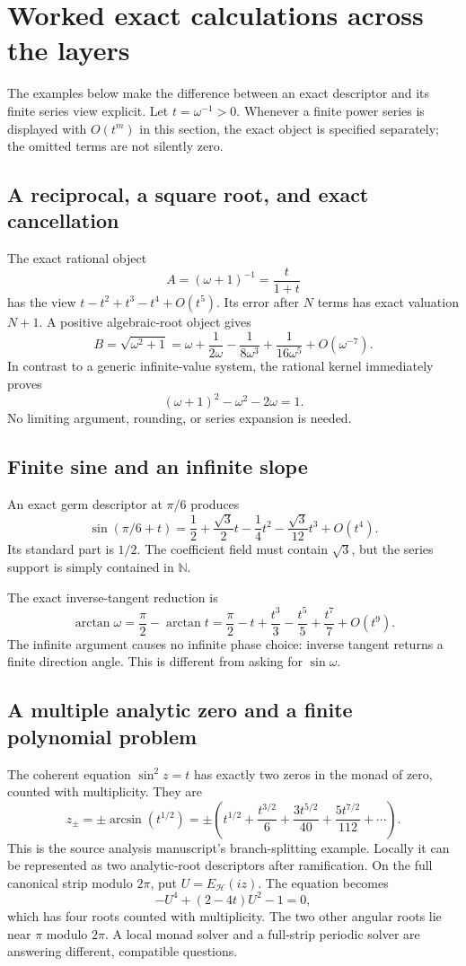 \documentclass[11pt,letterpaper]{article}
\theoremstyle{definition}
\newcommand{\N}{\mathbb N}
\numberwithin{equation}{section}
\begin{document}
\section{Worked exact calculations across the layers}\label{sec:examples}
The examples below make the difference between an exact descriptor and its finite series view explicit. Let $t=\omega^{-1}>0$. Whenever a finite power series is displayed with $O(t^m)$ in this section, the exact object is specified separately; the omitted terms are not silently zero.

\subsection{A reciprocal, a square root, and exact cancellation}
The exact rational object
\[
 A=(\omega+1)^{-1}=\frac{t}{1+t}
\]
has the view $t-t^2+t^3-t^4+O(t^5)$. Its error after $N$ terms has exact valuation $N+1$. A positive algebraic-root object gives
\[
 B=\sqrt{\omega^2+1}
  =\omega+\frac1{2\omega}-\frac1{8\omega^3}
       +\frac1{16\omega^5}+O(\omega^{-7}).
\]
In contrast to a generic infinite-value system, the rational kernel immediately proves
\[
 (\omega+1)^2-\omega^2-2\omega=1.
\]
No limiting argument, rounding, or series expansion is needed.

\subsection{Finite sine and an infinite slope}
An exact germ descriptor at $\pi/6$ produces
\[
 \sin(\pi/6+t)
 =\frac12+\frac{\sqrt3}{2}t-\frac14t^2
         -\frac{\sqrt3}{12}t^3+O(t^4).
\]
Its standard part is $1/2$. The coefficient field must contain $\sqrt3$, but the series support is simply contained in $\N$.

The exact inverse-tangent reduction is
\[
 \arctan\omega=\frac\pi2-\arctan t
 =\frac\pi2-t+\frac{t^3}{3}-\frac{t^5}{5}
       +\frac{t^7}{7}+O(t^9).
\]
The infinite argument causes no infinite phase choice: inverse tangent returns a finite direction angle. This is different from asking for $\sin\omega$.

\subsection{A multiple analytic zero and a finite polynomial problem}
The coherent equation $\sin^2 z=t$ has exactly two zeros in the monad of zero, counted with multiplicity. They are
\[
 z_\pm=\pm\arcsin(t^{1/2})
 =\pm\left(t^{1/2}+\frac{t^{3/2}}6+
           \frac{3t^{5/2}}{40}+\frac{5t^{7/2}}{112}+\cdots\right).
\]
This is the source analysis manuscript's branch-splitting example. Locally it can be represented as two analytic-root descriptors after ramification. On the full canonical strip modulo $2\pi$, put $U=E_{\mathscr H}(iz)$. The equation becomes
\[
 -U^4+(2-4t)U^2-1=0,
\]
which has four roots counted with multiplicity. The two other angular roots lie near $\pi$ modulo $2\pi$. A local monad solver and a full-strip periodic solver are answering different, compatible questions.
\end{document}
